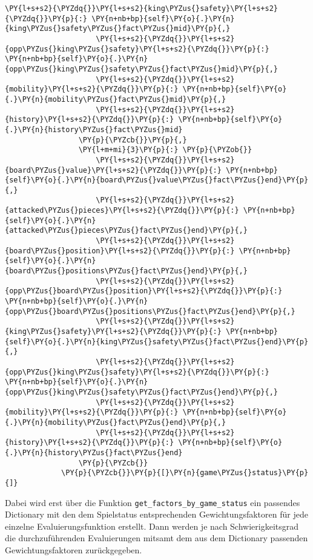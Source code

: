 \begin{Verbatim}[commandchars=\\\{\}]
                     \PY{l+s+s2}{\PYZdq{}}\PY{l+s+s2}{king\PYZus{}safety}\PY{l+s+s2}{\PYZdq{}}\PY{p}{:} \PY{n+nb+bp}{self}\PY{o}{.}\PY{n}{king\PYZus{}safety\PYZus{}fact\PYZus{}mid}\PY{p}{,}
                     \PY{l+s+s2}{\PYZdq{}}\PY{l+s+s2}{opp\PYZus{}king\PYZus{}safety}\PY{l+s+s2}{\PYZdq{}}\PY{p}{:} \PY{n+nb+bp}{self}\PY{o}{.}\PY{n}{opp\PYZus{}king\PYZus{}safety\PYZus{}fact\PYZus{}mid}\PY{p}{,}
                     \PY{l+s+s2}{\PYZdq{}}\PY{l+s+s2}{mobility}\PY{l+s+s2}{\PYZdq{}}\PY{p}{:} \PY{n+nb+bp}{self}\PY{o}{.}\PY{n}{mobility\PYZus{}fact\PYZus{}mid}\PY{p}{,}
                     \PY{l+s+s2}{\PYZdq{}}\PY{l+s+s2}{history}\PY{l+s+s2}{\PYZdq{}}\PY{p}{:} \PY{n+nb+bp}{self}\PY{o}{.}\PY{n}{history\PYZus{}fact\PYZus{}mid}
                 \PY{p}{\PYZcb{}}\PY{p}{,}
                 \PY{l+m+mi}{3}\PY{p}{:} \PY{p}{\PYZob{}}
                     \PY{l+s+s2}{\PYZdq{}}\PY{l+s+s2}{board\PYZus{}value}\PY{l+s+s2}{\PYZdq{}}\PY{p}{:} \PY{n+nb+bp}{self}\PY{o}{.}\PY{n}{board\PYZus{}value\PYZus{}fact\PYZus{}end}\PY{p}{,}
                     \PY{l+s+s2}{\PYZdq{}}\PY{l+s+s2}{attacked\PYZus{}pieces}\PY{l+s+s2}{\PYZdq{}}\PY{p}{:} \PY{n+nb+bp}{self}\PY{o}{.}\PY{n}{attacked\PYZus{}pieces\PYZus{}fact\PYZus{}end}\PY{p}{,}
                     \PY{l+s+s2}{\PYZdq{}}\PY{l+s+s2}{board\PYZus{}position}\PY{l+s+s2}{\PYZdq{}}\PY{p}{:} \PY{n+nb+bp}{self}\PY{o}{.}\PY{n}{board\PYZus{}positions\PYZus{}fact\PYZus{}end}\PY{p}{,}
                     \PY{l+s+s2}{\PYZdq{}}\PY{l+s+s2}{opp\PYZus{}board\PYZus{}position}\PY{l+s+s2}{\PYZdq{}}\PY{p}{:} \PY{n+nb+bp}{self}\PY{o}{.}\PY{n}{opp\PYZus{}board\PYZus{}positions\PYZus{}fact\PYZus{}end}\PY{p}{,}
                     \PY{l+s+s2}{\PYZdq{}}\PY{l+s+s2}{king\PYZus{}safety}\PY{l+s+s2}{\PYZdq{}}\PY{p}{:} \PY{n+nb+bp}{self}\PY{o}{.}\PY{n}{king\PYZus{}safety\PYZus{}fact\PYZus{}end}\PY{p}{,}
                     \PY{l+s+s2}{\PYZdq{}}\PY{l+s+s2}{opp\PYZus{}king\PYZus{}safety}\PY{l+s+s2}{\PYZdq{}}\PY{p}{:} \PY{n+nb+bp}{self}\PY{o}{.}\PY{n}{opp\PYZus{}king\PYZus{}safety\PYZus{}fact\PYZus{}end}\PY{p}{,}
                     \PY{l+s+s2}{\PYZdq{}}\PY{l+s+s2}{mobility}\PY{l+s+s2}{\PYZdq{}}\PY{p}{:} \PY{n+nb+bp}{self}\PY{o}{.}\PY{n}{mobility\PYZus{}fact\PYZus{}end}\PY{p}{,}
                     \PY{l+s+s2}{\PYZdq{}}\PY{l+s+s2}{history}\PY{l+s+s2}{\PYZdq{}}\PY{p}{:} \PY{n+nb+bp}{self}\PY{o}{.}\PY{n}{history\PYZus{}fact\PYZus{}end}
                 \PY{p}{\PYZcb{}}
             \PY{p}{\PYZcb{}}\PY{p}{[}\PY{n}{game\PYZus{}status}\PY{p}{]}
\end{Verbatim}

    Dabei wird erst über die Funktion
\texttt{get\_factors\_by\_game\_status} ein passendes Dictionary mit den
dem Spielstatus entsprechenden Gewichtungsfaktoren für jede einzelne
Evaluierungsfunktion erstellt. Dann werden je nach Schwierigkeitsgrad
die durchzuführenden Evaluierungen mitsamt dem aus dem Dictionary
passenden Gewichtungsfaktoren zurückgegeben.


